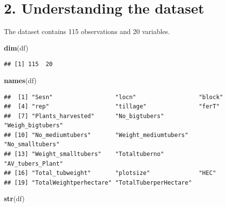 \documentclass[
]{article}
\newenvironment{Shaded}{\begin{snugshade}}{\end{snugshade}}
\newcommand{\FunctionTok}[1]{\textcolor[rgb]{0.13,0.29,0.53}{\textbf{#1}}}
\newcommand{\NormalTok}[1]{#1}
\begin{document}
\section{2. Understanding the dataset}\label{understanding-the-dataset}

The dataset contains 115 observations and 20 variables.

\begin{Shaded}
\begin{Highlighting}[]
\FunctionTok{dim}\NormalTok{(df)}
\end{Highlighting}
\end{Shaded}

\begin{verbatim}
## [1] 115  20
\end{verbatim}

\begin{Shaded}
\begin{Highlighting}[]
\FunctionTok{names}\NormalTok{(df)}
\end{Highlighting}
\end{Shaded}

\begin{verbatim}
##  [1] "Sesn"                  "locn"                  "block"                
##  [4] "rep"                   "tillage"               "ferT"                 
##  [7] "Plants_harvested"      "No_bigtubers"          "Weigh_bigtubers"      
## [10] "No_mediumtubers"       "Weight_mediumtubers"   "No_smalltubers"       
## [13] "Weight_smalltubers"    "Totaltuberno"          "AV_tubers_Plant"      
## [16] "Total_tubweight"       "plotsize"              "HEC"                  
## [19] "TotalWeightperhectare" "TotalTuberperHectare"
\end{verbatim}

\begin{Shaded}
\begin{Highlighting}[]
\FunctionTok{str}\NormalTok{(df)}
\end{Highlighting}
\end{Shaded}
\end{document}
